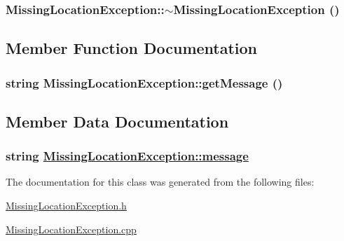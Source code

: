 \hypertarget{class_missing_location_exception_94b992eb7227b7923acd746a7d4b5f86}{
\subsubsection[$\sim$MissingLocationException]{\setlength{\rightskip}{0pt plus 5cm}Missing\-Location\-Exception::$\sim$Missing\-Location\-Exception ()}}
\label{class_missing_location_exception_94b992eb7227b7923acd746a7d4b5f86}




\subsection{Member Function Documentation}
\hypertarget{class_missing_location_exception_d3115ba6a009eec3cfb9fdc7af4c7fdb}{
\subsubsection[getMessage]{\setlength{\rightskip}{0pt plus 5cm}string Missing\-Location\-Exception::get\-Message ()}}
\label{class_missing_location_exception_d3115ba6a009eec3cfb9fdc7af4c7fdb}




\subsection{Member Data Documentation}
\hypertarget{class_missing_location_exception_78e731027d8fd50ed642340b7c9a63b3}{
\subsubsection[message]{\setlength{\rightskip}{0pt plus 5cm}string \hyperlink{class_missing_location_exception_78e731027d8fd50ed642340b7c9a63b3}{Missing\-Location\-Exception::message}}}
\label{class_missing_location_exception_78e731027d8fd50ed642340b7c9a63b3}




The documentation for this class was generated from the following files:\begin{CompactItemize}
\item 
\hyperlink{_missing_location_exception_8h}{Missing\-Location\-Exception.h}\item 
\hyperlink{_missing_location_exception_8cpp}{Missing\-Location\-Exception.cpp}\end{CompactItemize}
